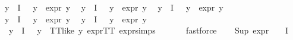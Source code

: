 \begin{isabellebody}
{\isachardoublequoteopen}{\isacharparenleft}{\kern0pt}{\isasymforall}y{\isasymin}{\isasymPhi}\ {\isacharbackquote}{\kern0pt}\ I{\isachardot}{\kern0pt}\ {\isasymphi}\ {\isasymnoteq}\ y\ {\isasymlongrightarrow}\ expr{\isacharunderscore}{\kern0pt}{}\ y\ {\isacharequal}{\kern0pt}\ {}{\isacharparenright}{\kern0pt}{\isachardoublequoteclose}\isanewline
{\isachardoublequoteopen}{\isacharparenleft}{\kern0pt}{\isasymforall}y{\isasymin}{\isasymPhi}\ {\isacharbackquote}{\kern0pt}\ I{\isachardot}{\kern0pt}\ {\isasymphi}\ {\isasymnoteq}\ y\ {\isasymlongrightarrow}\ expr{\isacharunderscore}{\kern0pt}{}\ y\ {\isacharequal}{\kern0pt}\ {}{\isacharparenright}{\kern0pt}{\isachardoublequoteclose}\isanewline
{\isachardoublequoteopen}{\isacharparenleft}{\kern0pt}{\isasymforall}y{\isasymin}{\isasymPhi}\ {\isacharbackquote}{\kern0pt}\ I{\isachardot}{\kern0pt}\ {\isasymphi}\ {\isasymnoteq}\ y\ {\isasymlongrightarrow}\ expr{\isacharunderscore}{\kern0pt}{}\ y\ {\isacharequal}{\kern0pt}\ {}{\isacharparenright}{\kern0pt}{\isachardoublequoteclose}\isanewline
{\isachardoublequoteopen}{\isacharparenleft}{\kern0pt}{\isasymforall}y{\isasymin}{\isasymPhi}\ {\isacharbackquote}{\kern0pt}\ I{\isachardot}{\kern0pt}\ {\isasymphi}\ {\isasymnoteq}\ y\ {\isasymlongrightarrow}\ expr{\isacharunderscore}{\kern0pt}{}\ y\ {\isacharequal}{\kern0pt}\ {}{\isacharparenright}{\kern0pt}{\isachardoublequoteclose}\isanewline
{\isachardoublequoteopen}{\isacharparenleft}{\kern0pt}{\isasymforall}y{\isasymin}{\isasymPhi}\ {\isacharbackquote}{\kern0pt}\ I{\isachardot}{\kern0pt}\ {\isasymphi}\ {\isasymnoteq}\ y\ {\isasymlongrightarrow}\ expr{\isacharunderscore}{\kern0pt}{}\ y\ {\isacharequal}{\kern0pt}\ {}{\isacharparenright}{\kern0pt}{\isachardoublequoteclose}\isanewline
\ \ \ \ \isamarkupfalse%
\ {\isacartoucheopen}{\isacharparenleft}{\kern0pt}{\isasymforall}y{\isasymin}{\isasymPhi}\ {\isacharbackquote}{\kern0pt}\ I{\isachardot}{\kern0pt}\ {\isasymphi}\ {\isasymnoteq}\ y\ {\isasymlongrightarrow}\ TT{\isacharunderscore}{\kern0pt}like\ y{\isacharparenright}{\kern0pt}{\isacartoucheclose}\ expr{\isacharunderscore}{\kern0pt}TT\ expr{\isachardot}{\kern0pt}simps\ \isanewline
\ \ \ \ \isamarkupfalse%
\ fastforce{\isacharplus}{\kern0pt}\isanewline
\ \ \isamarkupfalse%
\ {\isachardoublequoteopen}Sup\ {\isacharparenleft}{\kern0pt}{\isacharparenleft}{\kern0pt}expr{\isacharunderscore}{\kern0pt}{}\ {\isasymcirc}\ {\isasymPhi}{\isacharparenright}{\kern0pt}\ {\isacharbackquote}{\kern0pt}\ I{\isacharparenright}{\kern0pt}\ {\isasymle}\ {}{\isachardoublequoteclose}\isanewline

\end{isabellebody}
